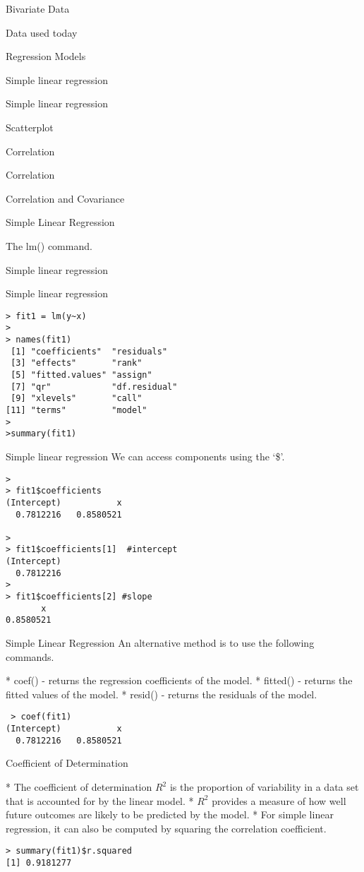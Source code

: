 \begin{slide}{Bivariate Data}
\begin{slide}{Data used today}
\begin{slide}{Regression Models}
\begin{slide}{Simple linear regression}
\begin{slide}{Simple linear regression}
\begin{slide}{Scatterplot}
\begin{slide}{Correlation}
\begin{slide}{Correlation}
\begin{slide}{Correlation and Covariance}
\begin{slide}{Simple Linear Regression}
\begin{slide}{The lm() command.}
\begin{slide}{Simple linear regression}
\begin{slide}{Simple linear regression}
\begin{verbatim}
> fit1 = lm(y~x)
>
> names(fit1)
 [1] "coefficients"  "residuals"
 [3] "effects"       "rank"
 [5] "fitted.values" "assign"
 [7] "qr"            "df.residual"
 [9] "xlevels"       "call"
[11] "terms"         "model"
>
>summary(fit1)
\end{verbatim}




\begin{slide}{Simple linear regression}
We can access components using the `\$'.
\begin{verbatim}
>
> fit1$coefficients
(Intercept)           x
  0.7812216   0.8580521

>
> fit1$coefficients[1]  #intercept
(Intercept)
  0.7812216
>
> fit1$coefficients[2] #slope
       x
0.8580521
\end{verbatim}



\begin{slide}{Simple Linear Regression}
An alternative method is to use the following commands.
\begin{itemize}
* coef() - returns the regression coefficients of the model.
* fitted() - returns the fitted values of the model.
* resid() - returns the residuals of the model.


\end{itemize}
 \begin{verbatim}
 > coef(fit1)
(Intercept)           x
  0.7812216   0.8580521
\end{verbatim}





\begin{slide}{Coefficient of Determination}
\begin{itemize}
* The coefficient of determination $R^2$ is  the proportion of variability in a data set
that is accounted for by the linear model.
* $R^2$ provides a measure of how well future outcomes are likely to be predicted by the model.
* For simple linear regression, it can also be computed by squaring the correlation coefficient.
\end{itemize}

\begin{verbatim}
> summary(fit1)$r.squared
[1] 0.9181277
\end{verbatim}





\end{slide}
\end{slide}
\end{slide}
\end{slide}
\end{slide}
\end{slide}
\end{slide}
\end{slide}
\end{slide}
\end{slide}
\end{slide}
\end{slide}
\end{slide}
\end{slide}
\end{slide}
\end{slide}
